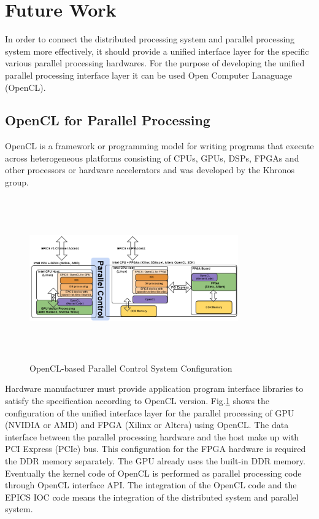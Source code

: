\documentclass[journal]{IEEEtran}
\begin{document}
\section{Future Work}
In order to connect the distributed processing system and parallel processing system more effectively, it should provide a unified interface layer for the specific various parallel processing hardwares. For the purpose of developing the unified parallel processing interface layer it can be used  Open Computer Lanaguage (OpenCL).

\subsection{OpenCL for Parallel Processing}
OpenCL\cite{opencl} is a framework or programming model for writing programs that execute across heterogeneous platforms consisting of CPUs, GPUs, DSPs, FPGAs and other processors or hardware accelerators and was developed by the Khronos group. 
\begin{figure}[!htb]
	\centering
	\includegraphics*[width=90mm, height=70mm]{img02.png}
	\caption{OpenCL-based Parallel Control System Configuration}
	\label{opencl_control_system}
\end{figure}
Hardware manufacturer must provide application program interface libraries to satisfy the specification according to OpenCL version. Fig.\ref{opencl_control_system} shows the configuration of the unified interface layer for the parallel processing of GPU (NVIDIA or AMD) and FPGA (Xilinx or Altera) using OpenCL. The data interface between the parallel processing hardware and the host make up with PCI Express (PCIe) bus. This configuration for the FPGA hardware is required the DDR memory separately. The GPU already uses the built-in DDR memory. Eventually the kernel code of OpenCL is performed as parallel processing code through OpenCL interface API. The integration of the OpenCL code and the EPICS IOC code means the integration of the distributed system and parallel system.
\end{document}
